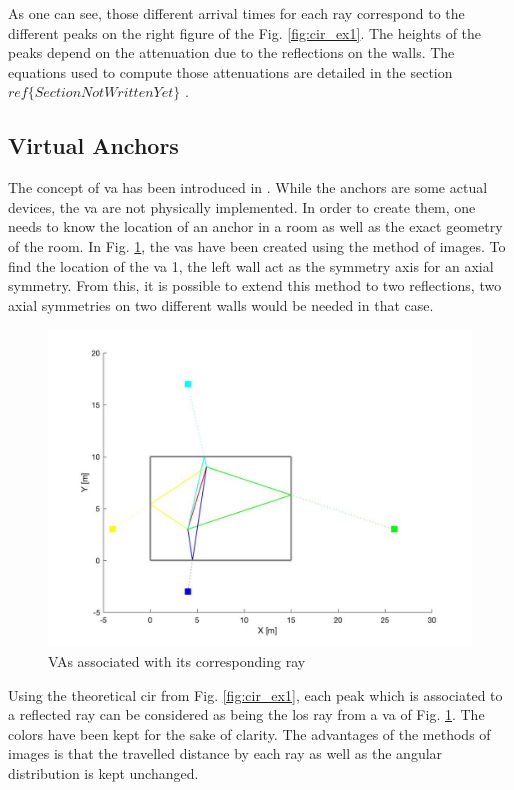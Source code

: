 As one can see, those different arrival times for each ray correspond to the different peaks on the right figure of the Fig. \ref{fig:cir_ex1}. The heights of the peaks depend on the attenuation due to the reflections on the walls. The equations used to compute those attenuations are detailed in the section \color{red} $ref\{SectionNotWrittenYet\}$ \color{black}. 

\subsection{Virtual Anchors}

The concept of \gls{va} has been introduced in  \cite{meissner2010uwb}. While the anchors are some actual devices, the \gls{va} are not physically implemented. In order to create them, one needs to know the location of an anchor in a room as well as the exact geometry of the room. In Fig. \ref{fig:va_room}, the \glspl{va} have been created using the method of images. To find the location of the \gls{va} 1, the left wall act as the symmetry axis for an axial symmetry. From this, it is possible to extend this method to two reflections, two axial symmetries on two different walls would be needed in that case.

\begin{figure}[H]
	\centering
	\includegraphics[width=.6\linewidth]{Images/va_map.jpg}
	\caption{VAs associated with its corresponding ray}
	\label{fig:va_room}
\end{figure}
 
Using the theoretical \gls{cir} from Fig. \ref{fig:cir_ex1}, each peak which is associated to a reflected ray can be considered as being the \gls{los} ray from a \gls{va} of Fig. \ref{fig:va_room}. The colors have been kept for the sake of clarity. The advantages of the methods of images is that the travelled distance by each ray as well as the angular distribution is kept unchanged.


